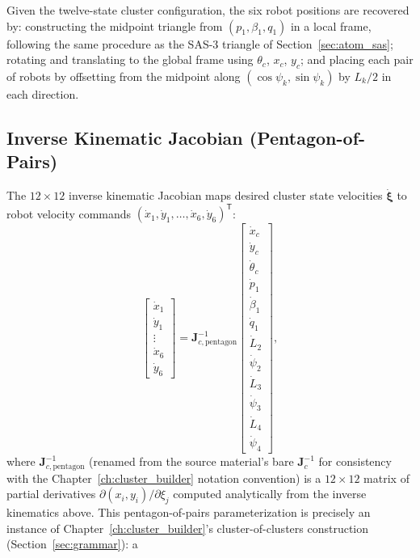 \documentclass[12pt, letterpaper, oneside]{report}
\begin{document}
Given the twelve-state cluster configuration, the six robot positions
are recovered by: constructing the midpoint triangle from
$(p_1,\beta_1,q_1)$ in a local frame, following the same procedure as
the SAS-3 triangle of Section~\ref{sec:atom_sas}; rotating and
translating to the global frame using $\theta_c$, $x_c$, $y_c$; and
placing each pair of robots by offsetting from the midpoint along
$(\cos\psi_k,\sin\psi_k)$ by $L_k/2$ in each direction.

\subsection{Inverse Kinematic Jacobian (Pentagon-of-Pairs)}

The $12\times12$ inverse kinematic Jacobian maps desired cluster state
velocities $\dot{\boldsymbol{\xi}}$ to robot velocity commands
$(\dot x_1,\dot y_1,\ldots,\dot x_6,\dot y_6)^{\mathsf T}$:
\begin{equation}
\begin{bmatrix} \dot x_1\\\dot y_1\\\vdots\\\dot x_6\\\dot y_6 \end{bmatrix}
= \mathbf{J}_{c,\text{pentagon}}^{-1}
\begin{bmatrix} \dot x_c\\\dot y_c\\\dot\theta_c\\\dot p_1\\\dot\beta_1\\\dot q_1\\\dot L_2\\\dot\psi_2\\\dot L_3\\\dot\psi_3\\\dot L_4\\\dot\psi_4 \end{bmatrix},
\label{eq:inv_kin_jac_pentagon}
\end{equation}
where $\mathbf{J}_{c,\text{pentagon}}^{-1}$ (renamed from the source
material's bare $\mathbf{J}_c^{-1}$ for consistency with the
Chapter~\ref{ch:cluster_builder} notation convention) is a
$12\times12$ matrix of partial derivatives
$\partial(x_i,y_i)/\partial\xi_j$ computed analytically from the
inverse kinematics above. This pentagon-of-pairs parameterization is
precisely an instance of Chapter~\ref{ch:cluster_builder}'s
cluster-of-clusters construction (Section~\ref{sec:grammar}): a
\end{document}
